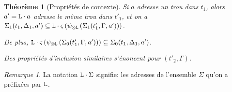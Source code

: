 \documentclass[11pt,a4paper]{article}
\theoremstyle{plain}
\newtheorem{theorem}{Théorème}
\theoremstyle{definition}
\theoremstyle{remark}
\newtheorem{remark}{Remarque}
\newcommand*{\tensor}{\otimes}
\newcommand*{\someperm}{\varsigma}
\newcommand*{\sequent}{\Gamma}
\newcommand*{\sequentbis}{\Delta}
\newcommand*{\Left}{\textnormal{\texttt{L}}}
\newcommand*{\lowapprox}{\ensuremath{\Sigma_0}}
\newcommand*{\highapprox}{\ensuremath{\Sigma_1}}
\begin{document}
\begin{theorem}[Propriétés de contexte]
    Si $a$ adresse un trou dans $t_1$, alors $a' = \Left \cdot a$ adresse le même trou dans $t'_1$, et on a $\highapprox(t_1, \sequentbis_1, a') \subseteq \Left \cdot \someperm \left( \psi_{\tensor\Left} \left(\highapprox(t'_1, \sequent, a')\right) \right)$. 
    
    De plus, $\Left \cdot \someperm \left( \psi_{\tensor\Left} \left(\lowapprox(t'_1, \sequent, a')\right) \right) \subseteq \lowapprox(t_1, \sequentbis_1, a')$.
    
    Des propriétés d'inclusion similaires s'énoncent pour $(t'_2, \sequent)$.
\end{theorem}

\begin{remark}
    La notation $\Left \cdot \Sigma$ signifie: les adresses de l'ensemble $\Sigma$ qu'on a préfixées par $\Left$.
\end{remark}
\end{document}

